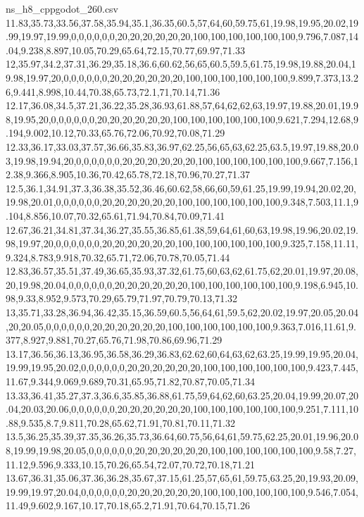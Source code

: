 \begin{filecontents*}[overwrite]{ns_h8_cppgodot_260.csv}
11.83,35.73,33.56,37.58,35.94,35.1,36.35,60.5,57,64,60,59.75,61,19.98,19.95,20.02,19.99,19.97,19.99,0,0,0,0,0,0,20,20,20,20,20,20,100,100,100,100,100,100,9.796,7.087,14.04,9.238,8.897,10.05,70.29,65.64,72.15,70.77,69.97,71.33
12,35.97,34.2,37.31,36.29,35.18,36.6,60.62,56,65,60.5,59.5,61.75,19.98,19.88,20.04,19.98,19.97,20,0,0,0,0,0,0,20,20,20,20,20,20,100,100,100,100,100,100,9.899,7.373,13.26,9.441,8.998,10.44,70.38,65.73,72.1,71,70.14,71.36
12.17,36.08,34.5,37.21,36.22,35.28,36.93,61.88,57,64,62,62,63,19.97,19.88,20.01,19.98,19.95,20,0,0,0,0,0,0,20,20,20,20,20,20,100,100,100,100,100,100,9.621,7.294,12.68,9.194,9.002,10.12,70.33,65.76,72.06,70.92,70.08,71.29
12.33,36.17,33.03,37.57,36.66,35.83,36.97,62.25,56,65,63,62.25,63.5,19.97,19.88,20.03,19.98,19.94,20,0,0,0,0,0,0,20,20,20,20,20,20,100,100,100,100,100,100,9.667,7.156,12.38,9.366,8.905,10.36,70.42,65.78,72.18,70.96,70.27,71.37
12.5,36.1,34.91,37.3,36.38,35.52,36.46,60.62,58,66,60,59,61.25,19.99,19.94,20.02,20,19.98,20.01,0,0,0,0,0,0,20,20,20,20,20,20,100,100,100,100,100,100,9.348,7.503,11.1,9.104,8.856,10.07,70.32,65.61,71.94,70.84,70.09,71.41
12.67,36.21,34.81,37.34,36.27,35.55,36.85,61.38,59,64,61,60,63,19.98,19.96,20.02,19.98,19.97,20,0,0,0,0,0,0,20,20,20,20,20,20,100,100,100,100,100,100,9.325,7.158,11.11,9.324,8.783,9.918,70.32,65.71,72.06,70.78,70.05,71.44
12.83,36.57,35.51,37.49,36.65,35.93,37.32,61.75,60,63,62,61.75,62,20.01,19.97,20.08,20,19.98,20.04,0,0,0,0,0,0,20,20,20,20,20,20,100,100,100,100,100,100,9.198,6.945,10.98,9.33,8.952,9.573,70.29,65.79,71.97,70.79,70.13,71.32
13,35.71,33.28,36.94,36.42,35.15,36.59,60.5,56,64,61,59.5,62,20.02,19.97,20.05,20.04,20,20.05,0,0,0,0,0,0,20,20,20,20,20,20,100,100,100,100,100,100,9.363,7.016,11.61,9.377,8.927,9.881,70.27,65.76,71.98,70.86,69.96,71.29
13.17,36.56,36.13,36.95,36.58,36.29,36.83,62.62,60,64,63,62,63.25,19.99,19.95,20.04,19.99,19.95,20.02,0,0,0,0,0,0,20,20,20,20,20,20,100,100,100,100,100,100,9.423,7.445,11.67,9.344,9.069,9.689,70.31,65.95,71.82,70.87,70.05,71.34
13.33,36.41,35.27,37.3,36.6,35.85,36.88,61.75,59,64,62,60,63.25,20.04,19.99,20.07,20.04,20.03,20.06,0,0,0,0,0,0,20,20,20,20,20,20,100,100,100,100,100,100,9.251,7.111,10.88,9.535,8.7,9.811,70.28,65.62,71.91,70.81,70.11,71.32
13.5,36.25,35.39,37.35,36.26,35.73,36.64,60.75,56,64,61,59.75,62.25,20.01,19.96,20.08,19.99,19.98,20.05,0,0,0,0,0,0,20,20,20,20,20,20,100,100,100,100,100,100,9.58,7.27,11.12,9.596,9.333,10.15,70.26,65.54,72.07,70.72,70.18,71.21
13.67,36.31,35.06,37.36,36.28,35.67,37.15,61.25,57,65,61,59.75,63.25,20,19.93,20.09,19.99,19.97,20.04,0,0,0,0,0,0,20,20,20,20,20,20,100,100,100,100,100,100,9.546,7.054,11.49,9.602,9.167,10.17,70.18,65.2,71.91,70.64,70.15,71.26

\end{filecontents*}
